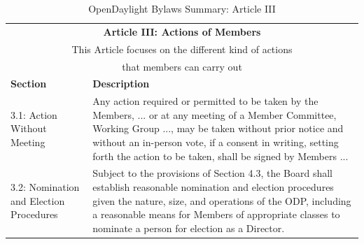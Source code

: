 \documentclass[a4paper, 12pt]{book}
\begin{document}
\begin{table}[H]
  \begin{center}
    \begin{tabular}{ | p{4cm} | p{11cm} | }
    \toprule
    \multicolumn {2}{|c|}{\textbf{Article III: Actions of Members}} \\
    \multicolumn {2}{|c|}{This Article focuses on the different kind of actions} \\
    \multicolumn {2}{|c|}{that members can carry out} \\
    \hline
    \textbf{Section} & \textbf{Description} \\
    \hline
    3.1: Action Without Meeting & Any action required or permitted to be taken by the Members, ... or at any meeting of a Member Committee, Working Group ..., may be taken without prior notice and without an in-person vote, if a consent in writing, setting forth the action to be taken, shall be signed by Members ...\\
    \hline
    3.2: Nomination and Election Procedures & Subject to the provisions of Section 4.3, the Board shall establish reasonable nomination and election procedures given the nature, size, and operations of the ODP, including a reasonable means for Members of appropriate classes to nominate a person for election as a Director.\\
    \bottomrule
    \end{tabular}
    \caption{OpenDaylight Bylaws Summary: Article III}
    \label{tab:odlbylaws-art03}
  \end{center}
\end{table}
\end{document}
